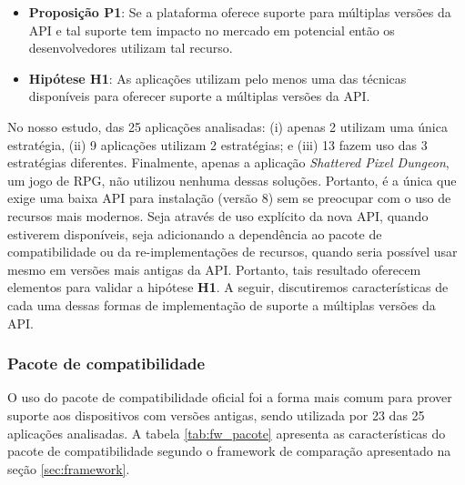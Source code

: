 \begin{itemize}
	\item \textbf{Proposição P1}: Se a plataforma oferece suporte para múltiplas versões
	da API e tal suporte tem impacto no mercado em potencial então os desenvolvedores
	utilizam tal recurso.
	\item \textbf{Hipótese H1}: As aplicações utilizam pelo menos uma das técnicas disponíveis
	para oferecer suporte a múltiplas versões da API.
\end{itemize}

No nosso estudo, das 25 aplicações analisadas: (i) apenas 2 utilizam uma única
estratégia, (ii) 9 aplicações utilizam 2 estratégias; e (iii) 13 fazem uso das
3 estratégias diferentes. Finalmente, apenas a aplicação \textit{Shattered Pixel
Dungeon}, um jogo de RPG, não utilizou nenhuma dessas soluções. Portanto, é a
única que exige uma baixa API para instalação (versão 8) sem se preocupar com
o uso de recursos mais modernos. Seja através de uso explícito da nova API,
quando estiverem disponíveis, seja adicionando a dependência ao pacote de
compatibilidade ou da re-implementações de recursos, quando seria possível usar
mesmo em versões mais antigas da API. Portanto, tais resultado oferecem elementos
para validar a hipótese \textbf{H1}. A seguir, discutiremos características de cada
uma dessas formas de implementação de suporte a múltiplas versões da API.

\subsubsection{Pacote de compatibilidade}
O uso do pacote de compatibilidade oficial foi a forma mais comum para prover
suporte aos dispositivos com versões antigas, sendo utilizada por 23 das 25
aplicações analisadas. A tabela \ref{tab:fw_pacote} apresenta as características
do pacote de compatibilidade segundo o framework de comparação apresentado na
seção \ref{sec:framework}.

